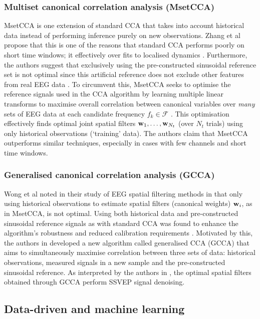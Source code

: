 \subsubsection{Multiset canonical correlation analysis (MsetCCA)}
MsetCCA is one extension of standard CCA that takes into account historical data instead of performing inference purely on new observations. Zhang et al propose that this is one of the reasons that standard CCA performs poorly on short time windows; it effectively over fits to localised dynamics \cite{zhang-mset-cca}. Furthermore, the authors suggest that exclusively using the pre-constructed sinusoidal reference set is not optimal since this artificial reference does not exclude other features from real EEG data \cite{zhang-mset-cca}. To circumvent this, MsetCCA seeks to optimise the reference signals used in the CCA algorithm by learning multiple linear transforms to maximise overall correlation between canonical variables over \textit{many} sets of EEG data at each candidate frequency $f_k \in \mathcal{F}$ \cite{zhang-mset-cca}. This optimisation effectively finds optimal joint spatial filters ${\mathbf{w}}_1, \dots, {\mathbf{w}}_{N_t}$ (over $N_t$ trials) using only historical observations (`training' data). The authors claim that MsetCCA outperforms similar techniques, especially in cases with few channels and short time windows. 

\subsubsection{Generalised canonical correlation analysis (GCCA)}
Wong et al noted in their study of EEG spatial filtering methods in \cite{wong-spatial-filt} that only using historical observations to estimate spatial filters (canonical weights) ${\mathbf{w}}_i$, as in MsetCCA, is not optimal. Using both historical data and pre-constructed sinusoidal reference signals as with standard CCA was found to enhance the algorithm's robustness and reduced calibration requirements \cite{wong-spatial-filt}.  Motivated by this, the authors in \cite{sun-gcca} developed a new algorithm called generalised CCA (GCCA) that aims to simultaneously maximise correlation between three sets of data: historical observations, measured signals in a new sample and the pre-constructed sinusoidal reference. As interpreted by the authors in \cite{sun-gcca}, the optimal spatial filters obtained through GCCA perform SSVEP signal denoising.

\subsection{Data-driven and machine learning}